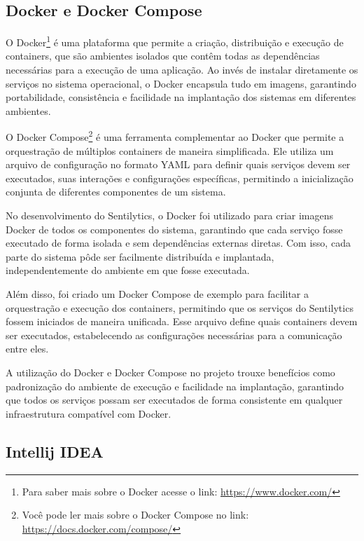 \documentclass[
	12pt,				%
	oneside,			%
	a4paper,			%
	english,			%
	french,				%
	spanish,			%
	brazil				%
	]{abntex2}
\begin{document}
\hypertarget{docker-e-docker-compose}{%
\subsection{Docker e Docker Compose}\label{docker-e-docker-compose}}

O Docker\footnote{Para saber mais sobre o Docker acesse o link:
  \url{https://www.docker.com/}} é uma plataforma que permite a criação,
distribuição e execução de containers, que são ambientes isolados que
contêm todas as dependências necessárias para a execução de uma
aplicação. Ao invés de instalar diretamente os serviços no sistema
operacional, o Docker encapsula tudo em imagens, garantindo
portabilidade, consistência e facilidade na implantação dos sistemas em
diferentes ambientes.

O Docker Compose\footnote{Você pode ler mais sobre o Docker Compose no
  link: \url{https://docs.docker.com/compose/}} é uma ferramenta
complementar ao Docker que permite a orquestração de múltiplos
containers de maneira simplificada. Ele utiliza um arquivo de
configuração no formato YAML para definir quais serviços devem ser
executados, suas interações e configurações específicas, permitindo a
inicialização conjunta de diferentes componentes de um sistema.

No desenvolvimento do Sentilytics, o Docker foi utilizado para criar
imagens Docker de todos os componentes do sistema, garantindo que cada
serviço fosse executado de forma isolada e sem dependências externas
diretas. Com isso, cada parte do sistema pôde ser facilmente distribuída
e implantada, independentemente do ambiente em que fosse executada.

Além disso, foi criado um Docker Compose de exemplo para facilitar a
orquestração e execução dos containers, permitindo que os serviços do
Sentilytics fossem iniciados de maneira unificada. Esse arquivo define
quais containers devem ser executados, estabelecendo as configurações
necessárias para a comunicação entre eles.

A utilização do Docker e Docker Compose no projeto trouxe benefícios
como padronização do ambiente de execução e facilidade na implantação,
garantindo que todos os serviços possam ser executados de forma
consistente em qualquer infraestrutura compatível com Docker.

\hypertarget{intellij-idea}{%
\subsection{Intellij IDEA}\label{intellij-idea}}
\end{document}
